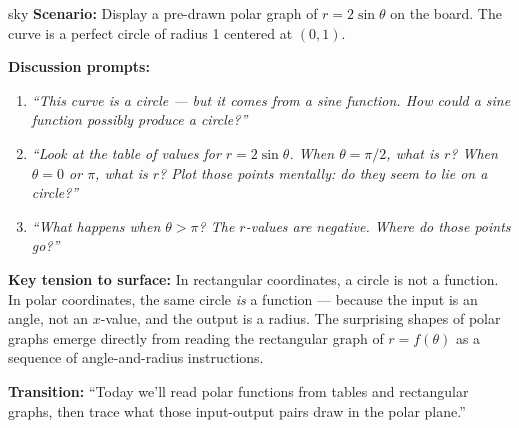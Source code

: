 \documentclass[10pt]{article}
\begin{document}
\begin{skillbox}{sky}
\textbf{Scenario:} Display a pre-drawn polar graph of $r = 2\sin\theta$ on the board.
The curve is a perfect circle of radius 1 centered at $(0, 1)$.

\textbf{Discussion prompts:}
\begin{enumerate}[leftmargin=1.4em, itemsep=3pt]
  \item \textit{``This curve is a circle --- but it comes from a sine function. How
    could a sine function possibly produce a circle?''}
  \item \textit{``Look at the table of values for $r = 2\sin\theta$.
    When $\theta = \pi/2$, what is $r$? When $\theta = 0$ or $\pi$, what is $r$?
    Plot those points mentally: do they seem to lie on a circle?''}
  \item \textit{``What happens when $\theta > \pi$? The $r$-values are negative.
    Where do those points go?''}
\end{enumerate}

\textbf{Key tension to surface:} In rectangular coordinates, a circle is not a
function. In polar coordinates, the same circle \emph{is} a function --- because
the input is an angle, not an $x$-value, and the output is a radius. The surprising
shapes of polar graphs emerge directly from reading the rectangular graph of $r = f(\theta)$
as a sequence of angle-and-radius instructions.

\textbf{Transition:} ``Today we'll read polar functions from tables and rectangular
graphs, then trace what those input-output pairs draw in the polar plane.''
\end{skillbox}

\vspace{0.08in}
\end{document}
